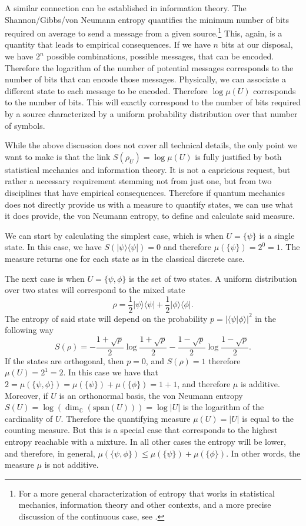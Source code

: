 \documentclass[entropy,article,submit,pdftex,moreauthors]{Definitions/mdpi}
\def\>{\rangle}
\def\<{\langle}
\begin{document}
A similar connection can be established in information theory. The Shannon/Gibbs/von Neumann entropy quantifies the minimum number of bits required on average to send a message from a given source.\footnote{For a more general characterization of entropy that works in statistical mechanics, information theory and other contexts, and a more precise discussion of the continuous case, see \cite{aop-phys-variability}.} This, again, is a quantity that leads to empirical consequences. If we have $n$ bits at our disposal, we have $2^n$ possible combinations, possible messages, that can be encoded. Therefore the logarithm of the number of potential messages corresponds to the number of bits that can encode those messages. Physically, we can associate a different state to each message to be encoded. Therefore $\log \mu(U)$ corresponds to the number of bits. This will exactly correspond to the number of bits required by a source characterized by a uniform probability distribution over that number of symbols.

While the above discussion does not cover all technical details, the only point we want to make is that the link $S(\rho_U) = \log \mu(U)$ is fully justified by both statistical mechanics and information theory. It is not a capricious request, but rather a necessary requirement stemming not from just one, but from two disciplines that have empirical consequences. Therefore if quantum mechanics does not directly provide us with a measure to quantify states, we can use what it does provide, the von Neumann entropy, to define and calculate said measure.

We can start by calculating the simplest case, which is when $U = \{ \psi \}$ is a single state. In this case, we have $S(|\psi\>\<\psi|) = 0$ and therefore $\mu(\{\psi\}) = 2^{0} = 1$. The measure returns one for each state as in the classical discrete case.

The next case is when $U = \{ \psi, \phi \}$ is the set of two states. A uniform distribution over two states will correspond to the mixed state
\begin{equation}
	\rho = \frac{1}{2} |\psi\>\<\psi| + \frac{1}{2} |\phi\>\<\phi|.
\end{equation}
The entropy of said state will depend on the probability $p=|\<\psi | \phi \>|^2$ in the following way
\begin{equation}
	S(\rho) = - \frac{1+\sqrt{p}}{2} \log \frac{1+\sqrt{p}}{2} 
	- \frac{1-\sqrt{p}}{2} \log \frac{1-\sqrt{p}}{2}.
\end{equation}
If the states are orthogonal, then $p=0$, and $S(\rho) = 1$ therefore $\mu(U) = 2^1 = 2$. In this case we have that $2 = \mu(\{ \psi, \phi \}) = \mu(\{\psi\}) + \mu(\{\phi\}) = 1 + 1$, and therefore $\mu$ is additive. Moreover, if $U$ is an orthonormal basis, the von Neumann entropy $S(U) = \log(\dim_{\mathbb{C}}(\text{span}(U))) = \log |U|$ is the logarithm of the cardinality of $U$. Therefore the quantifying measure $\mu(U) = |U|$ is equal to the counting measure. But this is a special case that corresponds to the highest entropy reachable with a mixture. In all other cases the entropy will be lower, and therefore, in general, $\mu(\{ \psi, \phi \}) \leq \mu(\{\psi\}) + \mu(\{\phi\})$. In other words, the measure $\mu$ is not additive.
\end{document}
